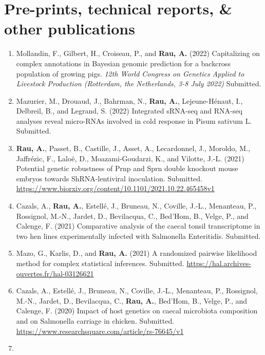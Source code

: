 \documentclass[11pt, a4paper]{awesome-cv}
\providecommand{\tightlist}{%
	\setlength{\itemsep}{0pt}\setlength{\parskip}{0pt}}
\begin{document}
\hypertarget{pre-prints-technical-reports-other-publications}{%
\section{Pre-prints, technical reports, \& other
publications}\label{pre-prints-technical-reports-other-publications}}

\begin{enumerate}
\def\labelenumi{\arabic{enumi}.}
\tightlist
\item
  Mollandin, F., Gilbert, H., Croiseau, P., and \textbf{Rau, A.} (2022)
  Capitalizing on complex annotations in Bayesian genomic prediction for
  a backcross population of growing pigs. \emph{12th World Congress on
  Genetics Applied to Livestock Production (Rotterdam, the Netherlands,
  3-8 July 2022)} Submitted.
\item
  Mazurier, M., Drouaud, J., Bahrman, N., \textbf{Rau, A.},
  Lejeune-Hénaut, I., Delbreil, B., and Legrand, S. (2022) Integrated
  sRNA-seq and RNA-seq analyses reveal micro-RNAs involved in cold
  response in Pisum sativum L. Submitted.
\item
  \textbf{Rau, A.}, Passet, B., Castille, J., Asset, A., Lecardonnel,
  J., Moroldo, M., Jaffrézic, F., Laloë, D., Moazami-Goudarzi, K., and
  Vilotte, J.-L. (2021) Potential genetic robustness of Prnp and Sprn
  double knockout mouse embryos towards ShRNA-lentiviral inoculation.
  Submitted.
  \url{https://www.biorxiv.org/content/10.1101/2021.10.22.465458v1}
\item
  Cazals, A., \textbf{Rau, A.}, Estellé, J., Bruneau, N., Coville,
  J.-L., Menanteau, P., Rossignol, M.-N., Jardet, D., Bevilacqua, C.,
  Bed'Hom, B., Velge, P., and Calenge, F. (2021) Comparative analysis of
  the caecal tonsil transcriptome in two hen lines experimentally
  infected with Salmonella Enteritidis. Submitted.
\item
  Mazo, G., Karlis, D., and \textbf{Rau, A.} (2021) A randomized
  pairwise likelihood method for complex statistical inferences.
  Submitted. \url{https://hal.archives-ouvertes.fr/hal-03126621}
\item
  Cazals, A., Estellé, J., Bruneau, N., Coville, J.-L., Menanteau, P.,
  Rossignol, M.-N., Jardet, D., Bevilacqua, C., \textbf{Rau, A.},
  Bed'Hom, B., Velge, P., and Calenge, F. (2020) Impact of host genetics
  on caecal microbiota composition and on Salmonella carriage in
  chicken. Submitted.
  \url{https://www.researchsquare.com/article/rs-76645/v1}
\item

\end{enumerate}
\end{document}

